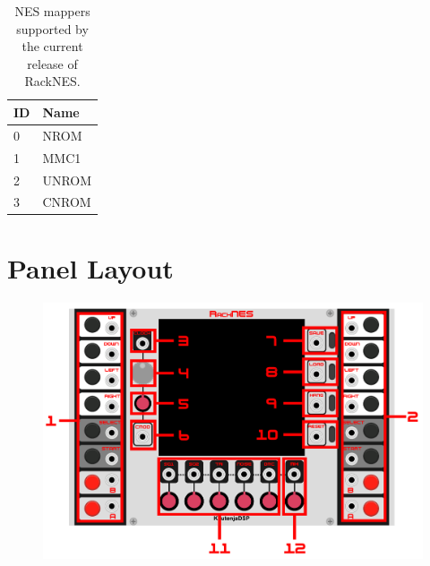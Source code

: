 \documentclass[12pt,a4paper]{article}
\begin{document}
\begin{table}[!htp]
\centering
\begin{tabular}{|l|l|}
 \hline
 ID & Name   \\
 \hline\hline
 0  & NROM   \\
 \hline
 1  & MMC1   \\
 \hline
 2  & UNROM  \\
 \hline
 3  & CNROM  \\
 \hline
\end{tabular}
\caption{NES mappers supported by the current release of RackNES.}
\label{tab:mappers}
\end{table}


\section{Panel Layout}

\begin{figure}[!htp]
\includegraphics[width=\textwidth]{RackNES-Manual}
\end{figure}
\end{document}
